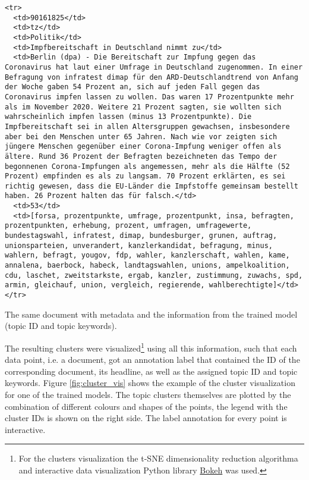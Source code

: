 \documentclass[fontsize=12pt,a4paper,twoside,openany]{scrbook}
\begin{document}
\begin{listing}[ht]
\begin{verbatim}
<tr>
  <td>90161825</td>
  <td>tz</td>
  <td>Politik</td>
  <td>Impfbereitschaft in Deutschland nimmt zu</td>
  <td>Berlin (dpa) - Die Bereitschaft zur Impfung gegen das Coronavirus hat laut einer Umfrage in Deutschland zugenommen. In einer Befragung von infratest dimap für den ARD-Deutschlandtrend von Anfang der Woche gaben 54 Prozent an, sich auf jeden Fall gegen das Coronavirus impfen lassen zu wollen. Das waren 17 Prozentpunkte mehr als im November 2020. Weitere 21 Prozent sagten, sie wollten sich wahrscheinlich impfen lassen (minus 13 Prozentpunkte). Die Impfbereitschaft sei in allen Altersgruppen gewachsen, insbesondere aber bei den Menschen unter 65 Jahren. Nach wie vor zeigten sich jüngere Menschen gegenüber einer Corona-Impfung weniger offen als ältere. Rund 36 Prozent der Befragten bezeichneten das Tempo der begonnenen Corona-Impfungen als angemessen, mehr als die Hälfte (52 Prozent) empfinden es als zu langsam. 70 Prozent erklärten, es sei richtig gewesen, dass die EU-Länder die Impfstoffe gemeinsam bestellt haben. 26 Prozent halten das für falsch.</td>
  <td>53</td>
  <td>[forsa, prozentpunkte, umfrage, prozentpunkt, insa, befragten, prozentpunkten, erhebung, prozent, umfragen, umfragewerte, bundestagswahl, infratest, dimap, bundesburger, grunen, auftrag, unionsparteien, unverandert, kanzlerkandidat, befragung, minus, wahlern, befragt, yougov, fdp, wahler, kanzlerschaft, wahlen, kame, annalena, baerbock, habeck, landtagswahlen, unions, ampelkoalition, cdu, laschet, zweitstarkste, ergab, kanzler, zustimmung, zuwachs, spd, armin, gleichauf, union, vergleich, regierende, wahlberechtigte]</td>
</tr>
\end{verbatim}
\caption{The same document with metadata and the information from the trained model (topic ID and topic keywords).} 
\label{listing:data-example}
\end{listing}

The resulting clusters were visualized\footnote{For the clusters visualization the t-SNE dimensionality reduction algorithma and interactive data visualization Python library \href{https://bokeh.org/}{Bokeh} was used.} using all this information, such that each data point, i.e. a document, got an annotation label that contained the ID of the corresponding document, its headline, as well as the assigned topic ID and topic keywords. Figure \ref{fig:cluster_vis} shows the example of the cluster visualization for one of the trained models. The topic clusters themselves are plotted by the combination of different colours and shapes of the points, the legend with the cluster IDs is shown on the right side. The label annotation for every point is interactive. 
\end{document}
